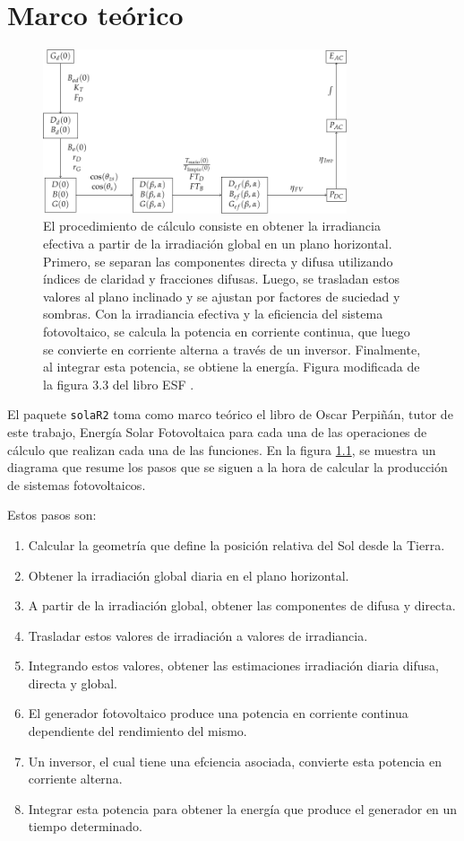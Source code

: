 \chapter{Marco teórico}
\label{chap:marco-teorico}
\begin{figure}[H]
\centering
\includegraphics[width=0.8\textwidth]{figuras/ProcedimientoCalculoRadiacionInclinada.pdf}
\caption{\label{fig:org9882d53}El procedimiento de cálculo consiste en obtener la irradiancia efectiva a partir de la irradiación global en un plano horizontal. Primero, se separan las componentes directa y difusa utilizando índices de claridad y fracciones difusas. Luego, se trasladan estos valores al plano inclinado y se ajustan por factores de suciedad y sombras. Con la irradiancia efectiva y la eficiencia del sistema fotovoltaico, se calcula la potencia en corriente continua, que luego se convierte en corriente alterna a través de un inversor. Finalmente, al integrar esta potencia, se obtiene la energía. Figura modificada de la figura 3.3 del libro ESF \cite{Perpinan2023}.}
\end{figure}


El paquete \texttt{solaR2} toma como marco teórico el libro de Oscar Perpiñán, tutor de este trabajo, Energía Solar Fotovoltaica \cite{Perpinan2023} para cada una de las operaciones de cálculo que realizan cada una de las funciones.
En la figura \ref{fig:org9882d53}, se muestra un diagrama que resume los pasos que se siguen a la hora de calcular la producción de sistemas fotovoltaicos.

Estos pasos son:
\begin{enumerate}
\item Calcular la geometría que define la posición relativa del Sol desde la Tierra.
\item Obtener la irradiación global diaria en el plano horizontal.
\item A partir de la irradiación global, obtener las componentes de difusa y directa.
\item Trasladar estos valores de irradiación a valores de irradiancia.
\item Integrando estos valores, obtener las estimaciones irradiación diaria difusa, directa y global.
\item El generador fotovoltaico produce una potencia en corriente continua dependiente del rendimiento del mismo.
\item Un inversor, el cual tiene una efciencia asociada, convierte esta potencia en corriente alterna.
\item Integrar esta potencia para obtener la energía que produce el generador en un tiempo determinado.
\end{enumerate}


